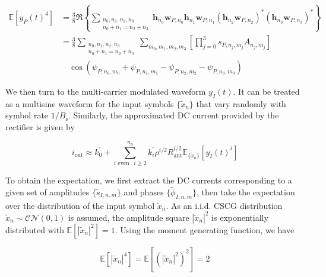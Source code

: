 \begin{align}\label{eqn:power_waveform_fourth_order}
  \mathbb{E}\left[ {{y_P}{{(t)}^4}} \right] &= \frac{3}{8}\Re \left\{ {\sum\limits_{\substack{{n_0},{n_1},{n_2},{n_3} \\ {n_0} + {n_1} = {n_2} + {n_3}}} {{{\mathbf{h}}_{{n_0}}}{{\mathbf{w}}_{P,{n_0}}}{{\mathbf{h}}_{{n_1}}}{{\mathbf{w}}_{P,{n_1}}}{{\left( {{{\mathbf{h}}_{{n_2}}}{{\mathbf{w}}_{P,{n_2}}}} \right)}^*}{{\left( {{{\mathbf{h}}_{{n_3}}}{{\mathbf{w}}_{P,{n_3}}}} \right)}^*}} } \right\} \\
   &= \frac{3}{8}\sum\limits_{\substack{{n_0},{n_1},{n_2},{n_3} \\ {n_0} + {n_1} = {n_2} + {n_3}}} {\sum\limits_{{m_0},{m_1},{m_2},{m_3}} {\left[ {\prod\limits_{j = 0}^3 {{s_{{P},{n_j},{m_j}}}} {A_{{n_j},{m_j}}}} \right] }} \nonumber \\
   &\quad \cos \left( {{\psi _{{P},{n_0},{m_0}}} + {\psi _{{P},{n_1},{m_1}}} - {\psi _{{P},{n_2},{m_2}}} - {\psi _{{P},{n_3},{m_3}}}} \right)
\end{align}

We then turn to the multi-carrier modulated waveform ${y_I}(t)$. It can be treated as a multisine waveform for the input symbols $\{ {{\tilde x}_n}\} $ that vary randomly with symbol rate $1/{B_{\text{s}}}$. Similarly, the approximated DC current provided by the rectifier is given by

\begin{equation}\label{eqn:current_information}
  {i_{\text{out}}} \approx k_0^\prime  + \sum\limits_{i{\text{ even }},i \geqslant 2}^{{n_o}} {k_i^\prime } {\rho ^{i/2}}R_{\text{ant}}^{i/2}{\mathbb{E}_{\{ {{\tilde x}_n}\} }}\left[ {{y_I}{{(t)}^i}} \right]
\end{equation}

To obtain the expectation, we first extract the DC currents corresponding to a given set of amplitudes $\{ {{\tilde s}_{I,n,m}}\} $ and phases $\{ {{\tilde \phi }_{I,n,m}}\} $, then take the expectation over the distribution of the input symbol ${{\tilde x}_n}$. As an i.i.d. CSCG distribution ${{\tilde x}_n}\sim\mathcal{C}\mathcal{N}(0,1)$ is assumed, the amplitude square ${\left| {{{\tilde x}_n}} \right|^2}$ is exponentially distributed with $\mathbb{E}\left[ {{{\left| {{{\tilde x}_n}} \right|}^2}} \right] = 1$. Using the moment generating function, we have

\begin{equation}\label{eqn:modulation_gain}
  \mathbb{E}\left[ {{{\left| {{{\tilde x}_n}} \right|}^4}} \right] = \mathbb{E}\left[ {{{\left( {{{\left| {{{\tilde x}_n}} \right|}^2}} \right)}^2}} \right] = 2
\end{equation}


